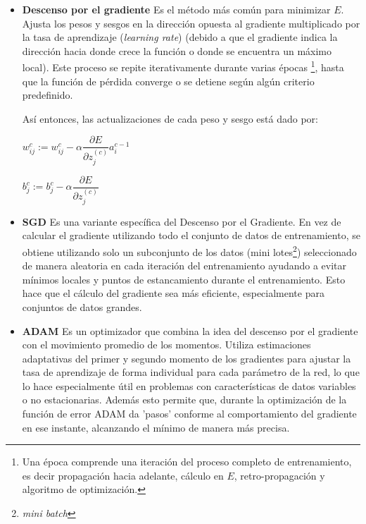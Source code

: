 \begin{itemize}
    \item \textbf{Descenso por el gradiente}
    Es el método más común para minimizar $E$. Ajusta los pesos y sesgos en la dirección opuesta al gradiente multiplicado por la tasa de aprendizaje (\textit{learning rate}) (debido a que el gradiente indica la dirección hacia donde crece la función o donde se encuentra un máximo local).
    Este proceso se repite iterativamente durante varias épocas \footnote{Una época comprende una iteración del proceso completo de entrenamiento, es decir propagación hacia adelante, cálculo en $E$, retro-propagación y algoritmo de optimización.}, hasta que la función de pérdida converge o se detiene según algún criterio predefinido.

    Así entonces, las actualizaciones de cada peso y sesgo está dado por:

\begin{center}
    $w_{ij}^{c} := w_{ij}^{c} - \alpha \dfrac{\partial E}{\partial z_{j}^{(c)}}a_i^{c-1}$

    $b^c_j := b^c_j - \alpha \dfrac{\partial E}{\partial z_{j}^{(c)}}$
\end{center}

    \item \textbf{SGD}
    Es una variante específica del Descenso por el Gradiente.
    En vez de calcular el gradiente utilizando todo el conjunto de datos de entrenamiento, se obtiene utilizando solo un subconjunto de los datos (mini lotes\footnote{\textit{mini batch}}) seleccionado de manera aleatoria en cada iteración del entrenamiento ayudando a evitar mínimos locales y puntos de estancamiento durante el entrenamiento. Esto hace que el cálculo del gradiente sea más eficiente, especialmente para conjuntos de datos grandes.
    
    \item \textbf{ADAM}
    Es un optimizador que combina la idea del descenso por el gradiente con el movimiento promedio de los momentos. Utiliza estimaciones adaptativas del primer y segundo momento de los gradientes para ajustar la tasa de aprendizaje de forma individual para cada parámetro de la red, lo que lo hace especialmente útil en problemas con características de datos variables o no estacionarias. \cite{adam_kingma}
    Además esto permite que, durante la optimización de la función de error ADAM da 'pasos' conforme al comportamiento del gradiente en ese instante, alcanzando el mínimo de manera más precisa. 


\end{itemize}
